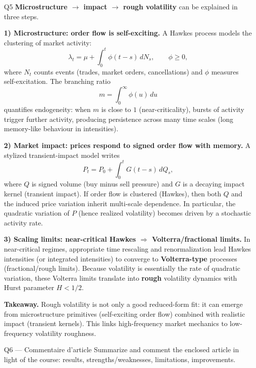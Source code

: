 \begin{solutionbox}{Q5}
\textbf{Microstructure $\rightarrow$ impact $\rightarrow$ rough volatility} can be explained in three steps.

\medskip
\textbf{1) Microstructure: order flow is self-exciting.} A Hawkes process models the clustering of market activity:
\[
\lambda_t=\mu+\int_0^t \phi(t-s)\,dN_s,\qquad \phi\ge 0,
\]
where \(N_t\) counts events (trades, market orders, cancellations) and \(\phi\) measures self-excitation. The branching ratio
\[
m=\int_0^\infty \phi(u)\,du
\]
quantifies endogeneity: when \(m\) is close to \(1\) (near-criticality), bursts of activity trigger further activity, producing persistence across many time scales (long memory-like behaviour in intensities).

\medskip
\textbf{2) Market impact: prices respond to signed order flow with memory.} A stylized transient-impact model writes
\[
P_t=P_0+\int_0^t G(t-s)\,dQ_s,
\]
where \(Q\) is signed volume (buy minus sell pressure) and \(G\) is a decaying impact kernel (transient impact). If order flow is clustered (Hawkes), then both \(Q\) and the induced price variation inherit multi-scale dependence. In particular, the quadratic variation of \(P\) (hence realized volatility) becomes driven by a stochastic activity rate.

\medskip
\textbf{3) Scaling limits: near-critical Hawkes $\Rightarrow$ Volterra/fractional limits.} In near-critical regimes, appropriate time rescaling and renormalization lead Hawkes intensities (or integrated intensities) to converge to \textbf{Volterra-type} processes (fractional/rough limits). Because volatility is essentially the rate of quadratic variation, these Volterra limits translate into \textbf{rough} volatility dynamics with Hurst parameter \(H<1/2\).

\medskip
\textbf{Takeaway.} Rough volatility is not only a good reduced-form fit: it can emerge from microstructure primitives (self-exciting order flow) combined with realistic impact (transient kernels). This links high-frequency market mechanics to low-frequency volatility roughness.
\end{solutionbox}

\begin{questionbox}{Q6 --- Commentaire d'article}
Summarize and comment the enclosed article in light of the course: results, strengths/weaknesses, limitations, improvements.
\end{questionbox}

